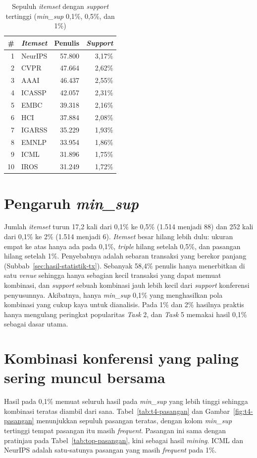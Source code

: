 \begin{table}[ht]
\caption{Sepuluh \textit{itemset} dengan \textit{support} tertinggi (\textit{min\_sup} 0,1\%, 0,5\%, dan 1\%)}
\label{tab:t4-top10}
\small
\begin{tabular}{@{}rlrr@{}}
\toprule
\textbf{\#} & \textbf{\textit{Itemset}} & \textbf{Penulis} & \textbf{\textit{Support}} \\
\midrule
1 & NeurIPS & 57.800 & 3,17\% \\
2 & CVPR & 47.664 & 2,62\% \\
3 & AAAI & 46.437 & 2,55\% \\
4 & ICASSP & 42.057 & 2,31\% \\
5 & EMBC & 39.318 & 2,16\% \\
6 & HCI & 37.884 & 2,08\% \\
7 & IGARSS & 35.229 & 1,93\% \\
8 & EMNLP & 33.954 & 1,86\% \\
9 & ICML & 31.896 & 1,75\% \\
10 & IROS & 31.249 & 1,72\% \\
\bottomrule
\end{tabular}
\end{table}

\section{Pengaruh \textit{min\_sup}}
\label{sec:hasil-t4-fp-minsup}
Jumlah \textit{itemset} turun 17,2 kali dari 0,1\% ke 0,5\% (1.514 menjadi 88) dan 252 kali dari 0,1\% ke 2\% (1.514 menjadi 6). \textit{Itemset} besar hilang lebih dulu: ukuran empat ke atas hanya ada pada 0,1\%, \textit{triple} hilang setelah 0,5\%, dan pasangan hilang setelah 1\%. Penyebabnya adalah sebaran transaksi yang berekor panjang (Subbab~\ref{sec:hasil-statistik-tx}). Sebanyak 58,4\% penulis hanya menerbitkan di satu \textit{venue} sehingga hanya sebagian kecil transaksi yang dapat memuat kombinasi, dan \textit{support} sebuah kombinasi jauh lebih kecil dari \textit{support} konferensi penyusunnya. Akibatnya, hanya \textit{min\_sup} 0,1\% yang menghasilkan pola kombinasi yang cukup kaya untuk dianalisis. Pada 1\% dan 2\% hasilnya praktis hanya mengulang peringkat popularitas \textit{Task} 2, dan \textit{Task} 5 memakai hasil 0,1\% sebagai dasar utama.

\section{Kombinasi konferensi yang paling sering muncul bersama}
\label{sec:hasil-t4-fp-kombinasi}
Hasil pada 0,1\% memuat seluruh hasil pada \textit{min\_sup} yang lebih tinggi sehingga kombinasi teratas diambil dari sana. Tabel~\ref{tab:t4-pasangan} dan Gambar~\ref{fig:t4-pasangan} menunjukkan sepuluh pasangan teratas, dengan kolom \textit{min\_sup} tertinggi tempat pasangan itu masih \textit{frequent}. Pasangan ini sama dengan pratinjau pada Tabel~\ref{tab:top-pasangan}, kini sebagai hasil \textit{mining}. ICML dan NeurIPS adalah satu-satunya pasangan yang masih \textit{frequent} pada 1\%.


